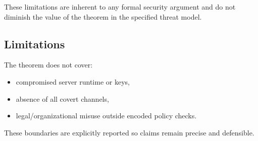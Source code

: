 These limitations are inherent to any formal security argument and do not diminish the value of the theorem in the specified threat model.

\subsection{Limitations}

The theorem does not cover:
\begin{itemize}
    \item compromised server runtime or keys,
    \item absence of all covert channels,
    \item legal/organizational misuse outside encoded policy checks.
\end{itemize}

These boundaries are explicitly reported so claims remain precise and defensible.
